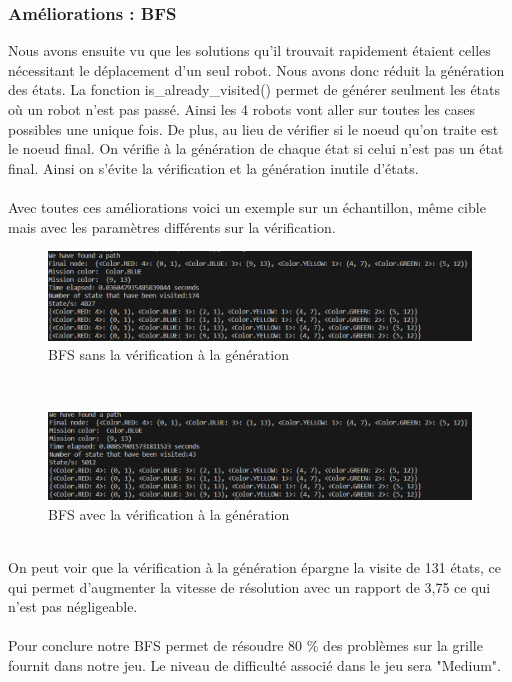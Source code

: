 \documentclass{article}
\begin{document}
\subsubsection{Améliorations : BFS}
Nous avons ensuite vu que les solutions qu'il trouvait rapidement étaient celles nécessitant le déplacement d'un seul robot. Nous avons donc réduit la génération des états. La fonction is\_already\_visited() permet de générer seulment les états où un robot n'est pas passé. Ainsi les 4 robots vont aller sur toutes les cases possibles une unique fois. De plus, au lieu de vérifier si le noeud qu'on traite est le noeud final. On vérifie à la génération de chaque état si celui n'est pas un état final. Ainsi on s'évite la vérification et la génération inutile d'états.\\\\
Avec toutes ces améliorations voici un exemple sur un échantillon, même cible mais avec les paramètres différents sur la vérification.
\begin{figure}[!h]
  \centering  
  \includegraphics[width=1\textwidth]{sans_verif_generation.png}  
  \caption{BFS sans la vérification à la génération} 
  \label{fig:Diagram}  
\end{figure}\\
\begin{figure}[!h]
  \centering  
  \includegraphics[width=1\textwidth]{avec_verif_generation.png}  
  \caption{BFS avec la vérification à la génération} 
  \label{fig:Diagram}  
\end{figure}\\
On peut voir que la vérification à la génération épargne la visite de 131 états, ce qui permet d'augmenter la vitesse de résolution avec un rapport de 3,75 ce qui n'est pas négligeable.\\\\
Pour conclure notre BFS permet de résoudre 80 \% des problèmes sur la grille fournit dans notre jeu. Le niveau de difficulté associé dans le jeu sera "Medium".
\end{document}
